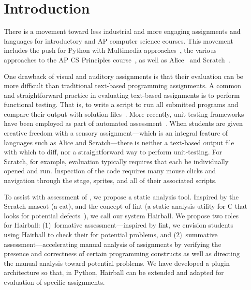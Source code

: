 \section{Introduction}
There is a movement toward less industrial and more engaging assignments and
languages for introductory and AP computer science courses.  This movement
includes the push for Python with Multimedia
approaches~\cite{Adams:2012:SLP:2157136.2157319, Forte:2004:CCC:962752.962945,
  Simon:2010:ERC:1822090.1822151}, the various approaches to the AP CS
Principles course~\cite{Snyder:2012:FFC:2189835.2189852}, as well as
Alice~\cite{Cooper:2003:TOI:611892.611966} and
Scratch~\cite{Maloney:2010:SPL:1868358.1868363}.

One drawback of visual and auditory assignments is that their evaluation can be
more difficult than traditional text-based programming assignments.  A common
and straightforward practice in evaluating text-based assignments is to perform
functional testing. That is, to write a script to run all submitted programs
and compare their output with solution
files~\cite{Jackson:1997:GSP:268084.268210}.  More recently, unit-testing
frameworks have been employed as part of automated
assessment~\cite{Spacco:2006:EMD:1140124.1140131,
  Edwards:2003:RCS:949344.949390}.  When students are given creative freedom
with a sensory assignment---which is an integral feature of languages such as
Alice and Scratch---there is neither a text-based output file with which to
diff, nor a straightforward way to perform unit-testing.  For Scratch, for
example, evaluation typically requires that each \sprogram{} be individually
opened and run.  Inspection of the code requires many mouse clicks and
navigation through the stage, sprites, and all of their associated scripts.

To assist with assessment of , we propose a static analysis tool.
Inspired by the Scratch mascot (a cat), and the concept of lint (a static
analysis utility for C that looks for potential defects~\cite{Johnson78lint}),
we call our system Hairball.  We propose two roles for Hairball: (1)~formative
assessment---inspired by lint, we envision students using Hairball to check
their  for potential problems, and (2)~summative
assessment---accelerating manual analysis of assignments by verifying the
presence and correctness of certain programming constructs as well as directing
the manual analysis toward potential problems.  We have developed a plugin
architecture so that, in Python, Hairball can be extended and adapted for
evaluation of specific assignments.

